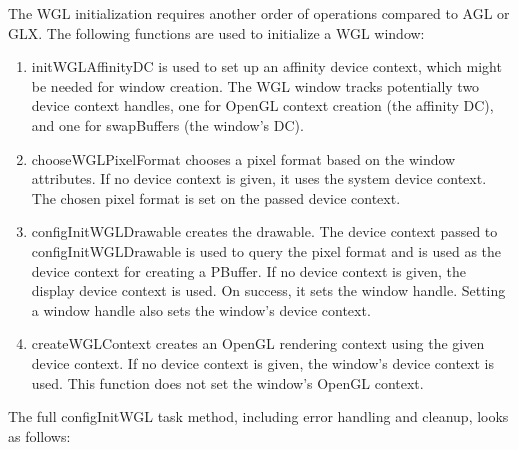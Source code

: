 \documentclass[10pt,a4]{scrartcl}
\begin{document}
The WGL initialization requires another order of operations compared to
AGL or GLX. The following functions are used to initialize a WGL window:

\begin{enumerate}
\item\textsf{initWGLAffinityDC} is used to set up an affinity device
  context, which might be needed for window creation. The WGL window
  tracks potentially two device context handles, one for OpenGL context
  creation (the affinity DC), and one for \textsf{swapBuffers} (the
  window's DC).
\item\textsf{chooseWGLPixelFormat} chooses a pixel format based on the
  window attributes. If no device context is given, it uses the system
  device context. The chosen pixel format is set on the passed device
  context.
\item\textsf{configInitWGLDrawable} creates the drawable. The device
  context passed to \textsf{configInitWGLDrawable} is used to query the
  pixel format and is used as the device context for creating a
  PBuffer. If no device context is given, the display device context is
  used. On success, it sets the window handle. Setting a window handle
  also sets the window's device context.
\item\textsf{createWGLContext} creates an OpenGL rendering context using
  the given device context. If no device context is given, the window's
  device context is used. This function does not set the window's OpenGL
  context.
\end{enumerate}

The full \textsf{configInitWGL} task method, including error handling
and cleanup, looks as follows:
\end{document}
